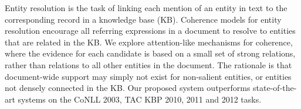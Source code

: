 Entity resolution is the task of linking each mention of an entity in text to the corresponding record in a knowledge base (KB).  Coherence models for entity resolution encourage all referring expressions in a document to resolve to entities that are related in the KB. We explore attention-like mechanisms for coherence, where the evidence for each candidate is based on a small set of strong relations, rather than relations to all other entities in the document. The rationale is that document-wide support may simply not exist for non-salient entities, or entities not densely connected in the KB. Our proposed system outperforms state-of-the-art systems on the CoNLL 2003, TAC KBP 2010, 2011 and 2012 tasks.
